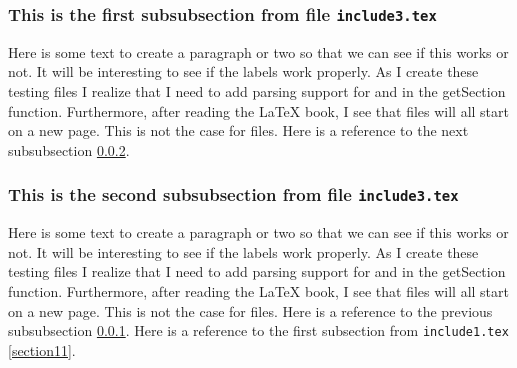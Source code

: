 \subsubsection{This is the first subsubsection from file \texttt{include3.tex}}
\label{section31}

Here is some text to create a paragraph or two so that we
can see if this works or not.  It will be interesting to see
if the labels work properly.  As I create these testing files
I realize that I need to add parsing support for \verb##
and \verb## in the getSection function.   Furthermore,
after reading the \LaTeX{} book, I see that \verb## 
files will all start on a new page.  This is not the case for
\verb## files.  Here is a reference to the next subsubsection \ref{section32}.

\subsubsection{This is the second subsubsection from file \texttt{include3.tex}}
\label{section32}

Here is some text to create a paragraph or two so that we
can see if this works or not.  It will be interesting to see
if the labels work properly.  As I create these testing files
I realize that I need to add parsing support for \verb##
and \verb## in the getSection function.   Furthermore,
after reading the \LaTeX{} book, I see that \verb## 
files will all start on a new page.  This is not the case for
\verb## files.  Here is a reference to the previous subsubsection \ref{section31}.
Here is a reference to the first subsection from \texttt{include1.tex}
\ref{section11}.
